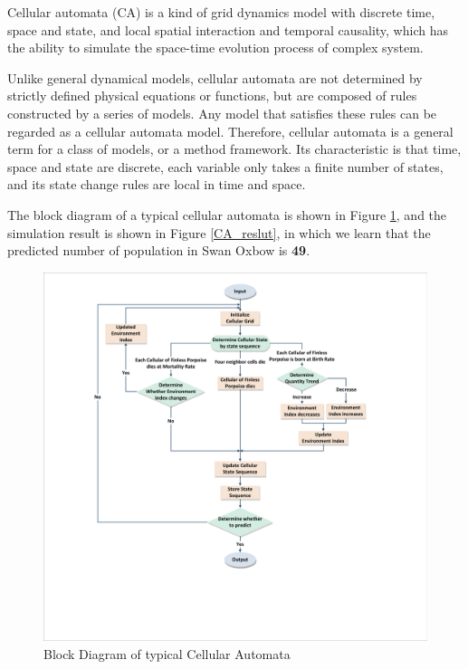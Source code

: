 \documentclass{mcmthesis}
\numberwithin{figure}{section}
\numberwithin{table}{section}
\numberwithin{equation}{section}
\begin{document}
Cellular automata (CA) is a kind of grid dynamics model with discrete time, 
space and state, and local spatial interaction and temporal causality, which 
has the ability to simulate the space-time evolution process of complex system.
\par
Unlike general dynamical models, cellular automata are not determined by strictly 
defined physical equations or functions, but are composed of rules constructed by 
a series of models. Any model that satisfies these rules can be regarded as a cellular 
automata model. Therefore, cellular automata is a general term for a class of models, 
or a method framework. Its characteristic is that time, space and state are discrete, 
each variable only takes a finite number of states, and its state change rules are local 
in time and space.
\par
The block diagram of a typical cellular automata is shown in Figure \ref{CA_Fig}, 
and the simulation result is shown in Figure \ref{CA_reslut}, in which
we learn that the predicted number of population in Swan Oxbow is \textbf{49}.


\begin{figure}[htbp]
  \centering
  \includegraphics[width = 14cm]{codes/CAFramwork.pdf}
  \caption{Block Diagram of typical Cellular Automata}\label{CA_Fig}
\end{figure}
\end{document}
